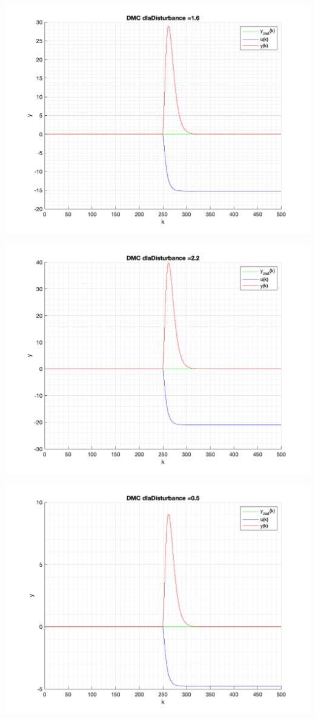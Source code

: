 \documentclass[a4paper, 11pt]{article}
\begin{document}
\begin{enumerate}
 \includegraphics[width=\linewidth]{./ModelsP4_Disturbance/P4_DMC_Disturbance_1_6_png.png} 
 
 \includegraphics[width=\linewidth]{./ModelsP4_Disturbance/P4_DMC_Disturbance_2_2_png.png} 
 
 \includegraphics[width=\linewidth]{./ModelsP4_Disturbance/P4_DMC_Disturbance_0_5_png.png} 
 

\end{enumerate}
\end{document}

